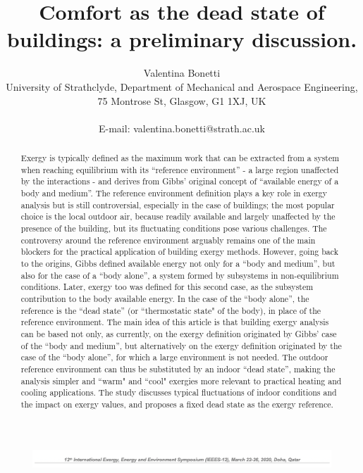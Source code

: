 \documentclass[10pt]{extarticle} %
\title{Comfort as the dead state of buildings: a preliminary discussion.}
\author{Valentina Bonetti\\ University of Strathclyde, Department of Mechanical and Aerospace Engineering, 75 Montrose St, Glasgow, G1 1XJ,  UK\\ \\ E-mail: valentina.bonetti@strath.ac.uk}
\date{}
\begin{document}
\renewcommand{\abstractname}{Abstract:}



\begin{figure}[!h]
\centering
\includegraphics[width=6.8in, center]{images/articleHeading1.png}
\end{figure}

\let\newpage\relax
\vspace*{-2cm}
\maketitle
\vspace*{-1cm}


\begin{abstract}

\noindent Exergy is typically defined as the maximum work that can be extracted from a system when reaching equilibrium with its ``reference environment'' - a large region unaffected by the interactions - and derives from Gibbs' original concept of ``available energy of a body and medium''. The reference environment definition  plays a key role in exergy analysis but is still controversial, especially in the case of buildings; the most popular choice is the local outdoor air, because readily available and largely unaffected by the presence of the building, but its fluctuating conditions pose various challenges. The controversy around the reference environment arguably remains one of the main blockers for the practical application of building exergy methods.
However, going back to the origins, Gibbs defined available energy not only for a ``body and medium'', but also for the case of a ``body alone'', a system formed by subsystems in non-equilibrium conditions. Later, exergy too was defined for this second case, as the subsystem contribution to the body available energy. In the case of the ``body alone'', the reference is the ``dead state'' (or ``thermostatic state" of the body), in place of the reference environment. 
The main idea of this article is that building exergy analysis can be based not only, as currently, on the exergy definition originated by Gibbs' case of the ``body and medium'', but alternatively on the exergy definition originated by the case of the  ``body alone'', for which a large environment is not needed.  The outdoor reference environment can thus be substituted by an indoor ``dead state'', making the analysis simpler and ``warm" and ``cool" exergies more relevant to practical heating and cooling applications. The study discusses typical fluctuations of indoor conditions and the impact on exergy values, and proposes a fixed dead state as the exergy reference.

\end{abstract}
\end{document}
